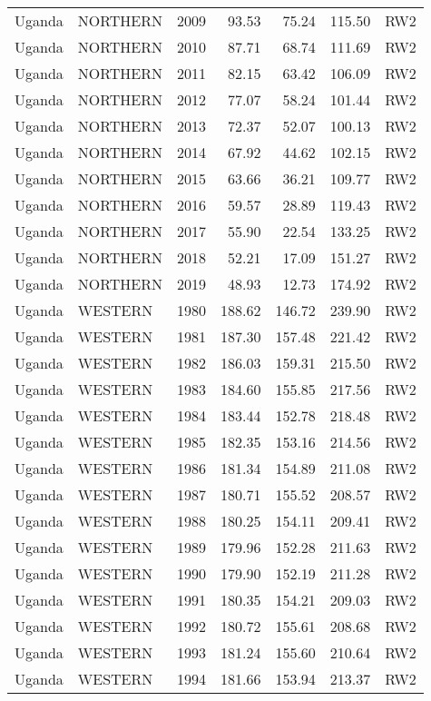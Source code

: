 \begin{longtable}{lllrrrl}
  Uganda & NORTHERN & 2009 & 93.53 & 75.24 & 115.50 & RW2 \\ 
  Uganda & NORTHERN & 2010 & 87.71 & 68.74 & 111.69 & RW2 \\ 
  Uganda & NORTHERN & 2011 & 82.15 & 63.42 & 106.09 & RW2 \\ 
  Uganda & NORTHERN & 2012 & 77.07 & 58.24 & 101.44 & RW2 \\ 
  Uganda & NORTHERN & 2013 & 72.37 & 52.07 & 100.13 & RW2 \\ 
  Uganda & NORTHERN & 2014 & 67.92 & 44.62 & 102.15 & RW2 \\ 
  Uganda & NORTHERN & 2015 & 63.66 & 36.21 & 109.77 & RW2 \\ 
  Uganda & NORTHERN & 2016 & 59.57 & 28.89 & 119.43 & RW2 \\ 
  Uganda & NORTHERN & 2017 & 55.90 & 22.54 & 133.25 & RW2 \\ 
  Uganda & NORTHERN & 2018 & 52.21 & 17.09 & 151.27 & RW2 \\ 
  Uganda & NORTHERN & 2019 & 48.93 & 12.73 & 174.92 & RW2 \\ 
  Uganda & WESTERN & 1980 & 188.62 & 146.72 & 239.90 & RW2 \\ 
  Uganda & WESTERN & 1981 & 187.30 & 157.48 & 221.42 & RW2 \\ 
  Uganda & WESTERN & 1982 & 186.03 & 159.31 & 215.50 & RW2 \\ 
  Uganda & WESTERN & 1983 & 184.60 & 155.85 & 217.56 & RW2 \\ 
  Uganda & WESTERN & 1984 & 183.44 & 152.78 & 218.48 & RW2 \\ 
  Uganda & WESTERN & 1985 & 182.35 & 153.16 & 214.56 & RW2 \\ 
  Uganda & WESTERN & 1986 & 181.34 & 154.89 & 211.08 & RW2 \\ 
  Uganda & WESTERN & 1987 & 180.71 & 155.52 & 208.57 & RW2 \\ 
  Uganda & WESTERN & 1988 & 180.25 & 154.11 & 209.41 & RW2 \\ 
  Uganda & WESTERN & 1989 & 179.96 & 152.28 & 211.63 & RW2 \\ 
  Uganda & WESTERN & 1990 & 179.90 & 152.19 & 211.28 & RW2 \\ 
  Uganda & WESTERN & 1991 & 180.35 & 154.21 & 209.03 & RW2 \\ 
  Uganda & WESTERN & 1992 & 180.72 & 155.61 & 208.68 & RW2 \\ 
  Uganda & WESTERN & 1993 & 181.24 & 155.60 & 210.64 & RW2 \\ 
  Uganda & WESTERN & 1994 & 181.66 & 153.94 & 213.37 & RW2 \\ 

\end{longtable}
